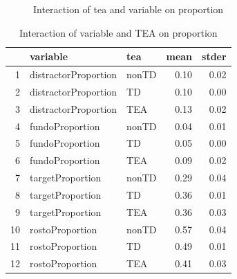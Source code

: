 \documentclass{article}
\begin{document}
\begin{figure}[H]
  \caption{Interaction of tea and variable on proportion}
  \noindent{}
  \centering
\end{figure}

\begin{table}[ht]
\centering
\caption{Interaction of variable and TEA on proportion}
\begin{tabular}{rllrr}
  \hline
 & variable & tea & mean & stder \\ 
  \hline
1 & distractorProportion & nonTD & 0.10 & 0.02 \\ 
  2 & distractorProportion & TD & 0.10 & 0.00 \\ 
  3 & distractorProportion & TEA & 0.13 & 0.02 \\ 
  4 & fundoProportion & nonTD & 0.04 & 0.01 \\ 
  5 & fundoProportion & TD & 0.05 & 0.00 \\ 
  6 & fundoProportion & TEA & 0.09 & 0.02 \\ 
  7 & targetProportion & nonTD & 0.29 & 0.04 \\ 
  8 & targetProportion & TD & 0.36 & 0.01 \\ 
  9 & targetProportion & TEA & 0.36 & 0.03 \\ 
  10 & rostoProportion & nonTD & 0.57 & 0.04 \\ 
  11 & rostoProportion & TD & 0.49 & 0.01 \\ 
  12 & rostoProportion & TEA & 0.41 & 0.03 \\ 
   \hline
\end{tabular}
\end{table}
\end{document}
